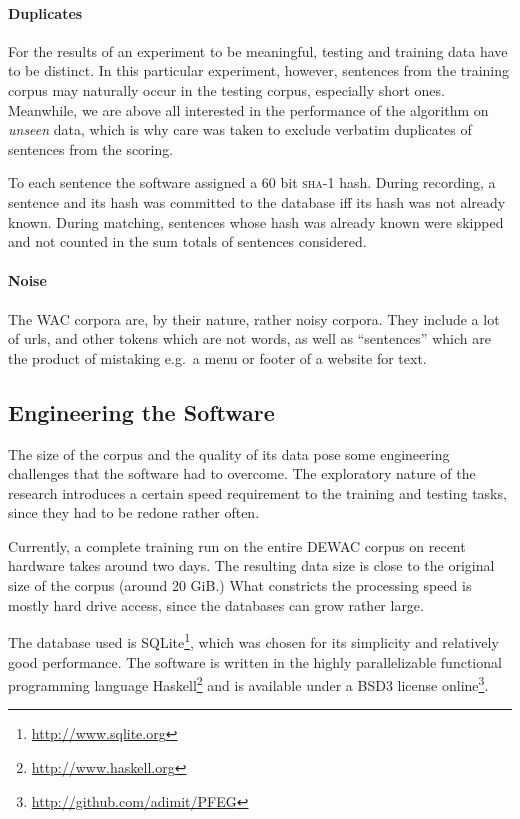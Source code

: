 \documentclass[draft,12pt]{article}
\begin{document}
\paragraph{Duplicates} For the results of an experiment to be meaningful,
testing and training data have to be distinct. In this particular experiment,
however, sentences from the training corpus may naturally occur in the testing
corpus, especially short ones. %
Meanwhile, we are above all interested in the performance of
the algorithm on \emph{unseen} data, which is why care was taken to exclude
verbatim duplicates of sentences from the scoring.

To each sentence the software assigned a 60 bit \textsc{sha-1} hash. During
recording, a sentence and its hash was committed to the database iff its hash
was not already known. During matching, sentences whose hash was already known
were skipped and not counted in the sum totals of sentences considered.

\paragraph{Noise} The WAC corpora are, by their nature, rather noisy corpora.
They include a lot of urls, and other tokens which are not words, as well as
``sentences'' which are the product of mistaking e.g.\ a menu or footer of a
website for text.

\subsection{Engineering the Software}
The size of the corpus and the quality of its data pose some engineering
challenges that the software had to overcome. The exploratory nature of the
research introduces a certain speed requirement to the training and testing
tasks, since they had to be redone rather often.

Currently, a complete training run on the entire DEWAC corpus on recent hardware
takes around two days.  The resulting data size is close to the original size of
the corpus (around 20 GiB.) What constricts the processing speed is mostly hard
drive access, since the databases can grow rather large.

The database used is SQLite\footnote{\url{http://www.sqlite.org}}, which was chosen for its
simplicity and relatively good performance. The software is written
in the highly parallelizable functional programming language
Haskell\footnote{\url{http://www.haskell.org}} and is available under a BSD3
license online\footnote{\url{http://github.com/adimit/PFEG}}.
\end{document}
